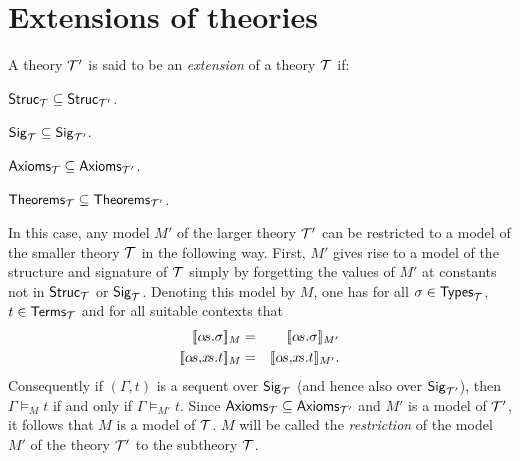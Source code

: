 \section{Extensions of theories}
\label{extensions}

A theory ${\cal T}'$ is said to be an {\em
extension\/} of a theory ${\cal T}$ if:
\begin{myenumerate}
\item ${\sf Struc}_{{\cal T}}\subseteq{\sf Struc}_{{\cal T}'}$.
\item ${\sf Sig}_{{\cal T}}\subseteq{\sf Sig}_{{\cal T}'}$.
\item ${\sf Axioms}_{{\cal T}}\subseteq{\sf Axioms}_{{\cal T}'}$.
\item ${\sf Theorems}_{{\cal T}}\subseteq{\sf Theorems}_{{\cal T}'}$.
\end{myenumerate}
In this case, any model $M'$ of the larger theory ${\cal T}'$ can be
restricted to a model of the smaller theory $\cal T$ in the following
way.  First, $M'$ gives rise to a model of the structure and signature
of $\cal T$ simply by forgetting the values of $M'$ at constants not
in ${\sf Struc}_{\cal T}$ or ${\sf Sig}_{\cal T}$. Denoting this model
by $M$, one has for all $\sigma\in{\sf Types}_{\cal T}$, $t\in{\sf
Terms}_{\cal T}$ and for all suitable contexts that
\begin{eqnarray*}
\den{\alpha\!s.\sigma}_{M}   & = & \den{\alpha\!s.\sigma}_{M'} \\
\den{\alpha\!s,\!x\!s.t}_{M} & = & \den{\alpha\!s,\!x\!s.t}_{M'}.
\end{eqnarray*}
Consequently if $(\Gamma,t)$ is a sequent over ${\sf Sig}_{\cal T}$
(and hence also over ${\sf Sig}_{{\cal T}'}$), then $\Gamma
\models_{M} t$ if and only if $\Gamma \models_{M'} t$. Since ${\sf
Axioms}_{\cal T}\subseteq{\sf Axioms}_{{\cal T}'}$ and $M'$ is a model
of ${\cal T}'$, it follows that $M$ is a model of $\cal T$. $M$ will
be called the {\em restriction} of the
model $M'$ of the theory ${\cal T}'$ to the subtheory $\cal T$.

\bigskip

